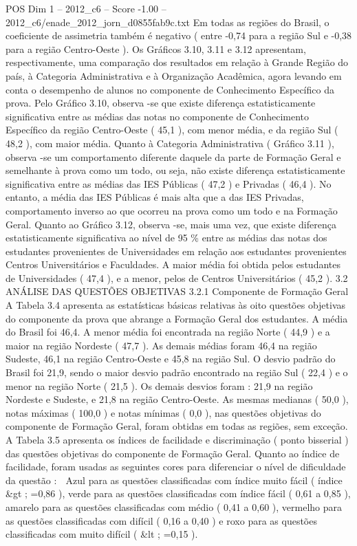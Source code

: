 \begin{textsample}{POS Dim 1 – 2012\_c6 – Score -1.00 – 2012\_c6/enade\_2012\_jorn\_d0855fab9c.txt}
Em todas as regiões do Brasil, o coeficiente de assimetria também é negativo ( entre -0,74 para a região Sul e -0,38 para a região Centro-Oeste ).
Os Gráficos 3.10, 3.11 e 3.12 apresentam, respectivamente, uma comparação dos resultados em relação à Grande Região do país, à Categoria Administrativa e à Organização Acadêmica, agora levando em conta o desempenho de alunos no componente de Conhecimento Específico da prova.
Pelo Gráfico 3.10, observa -se que existe diferença estatisticamente significativa entre as médias das notas no componente de Conhecimento Específico da região Centro-Oeste ( 45,1 ), com menor média, e da região Sul ( 48,2 ), com maior média.
Quanto à Categoria Administrativa ( Gráfico 3.11 ), observa -se um comportamento diferente daquele da parte de Formação Geral e semelhante à prova como um todo, ou seja, não existe diferença estatisticamente significativa entre as médias das IES Públicas ( 47,2 ) e Privadas ( 46,4 ).
No entanto, a média das IES Públicas é mais alta que a das IES Privadas, comportamento inverso ao que ocorreu na prova como um todo e na Formação Geral.
Quanto ao Gráfico 3.12, observa -se, mais uma vez, que existe diferença estatisticamente significativa ao nível de 95 \% entre as médias das notas dos estudantes provenientes de Universidades em relação aos estudantes provenientes Centros Universitários e Faculdades.
A maior média foi obtida pelos estudantes de Universidades ( 47,4 ), e a menor, pelos de Centros Universitários ( 45,2 ). 3.2 ANÁLISE DAS QUESTÕES OBJETIVAS 3.2.1 Componente de Formação Geral A Tabela 3.4 apresenta as estatísticas básicas relativas às oito questões objetivas do componente da prova que abrange a Formação Geral dos estudantes.
A média do Brasil foi 46,4.
A menor média foi encontrada na região Norte ( 44,9 ) e a maior na região Nordeste ( 47,7 ).
As demais médias foram 46,4 na região Sudeste, 46,1 na região Centro-Oeste e 45,8 na região Sul.
O desvio padrão do Brasil foi 21,9, sendo o maior desvio padrão encontrado na região Sul ( 22,4 ) e o menor na região Norte ( 21,5 ).
Os demais desvios foram : 21,9 na região Nordeste e Sudeste, e 21,8 na região Centro-Oeste.
As mesmas medianas ( 50,0 ), notas máximas ( 100,0 ) e notas mínimas ( 0,0 ), nas questões objetivas do componente de Formação Geral, foram obtidas em todas as regiões, sem exceção.
A Tabela 3.5 apresenta os índices de facilidade e discriminação ( ponto bisserial ) das questões objetivas do componente de Formação Geral.
Quanto ao índice de facilidade, foram usadas as seguintes cores para diferenciar o nível de dificuldade da questão :  Azul para as questões classificadas com índice muito fácil ( índice \&gt ; =0,86 ), verde para as questões classificadas com índice fácil ( 0,61 a 0,85 ), amarelo para as questões classificadas com médio ( 0,41 a 0,60 ), vermelho para as questões classificadas com difícil ( 0,16 a 0,40 ) e roxo para as questões classificadas com muito difícil ( \&lt ; =0,15 ).

\end{textsample}
